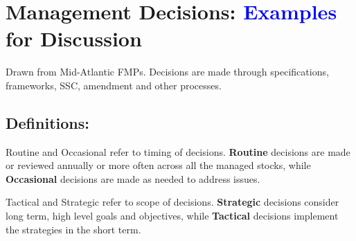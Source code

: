 \documentclass[
]{article}
\author{}
\date{\vspace{-2.5em}}
\begin{document}
\vspace{-1cm}

\section{\texorpdfstring{Management Decisions:
\textcolor{blue}{Examples} for
Discussion}{Management Decisions:  for Discussion}}\label{management-decisions-for-discussion}

Drawn from Mid-Atlantic FMPs. Decisions are made through specifications,
frameworks, SSC, amendment and other processes.

\subsection{Definitions:}\label{definitions}

\begin{noteblock}
Routine and Occasional refer to timing of decisions. \textbf{Routine}
decisions are made or reviewed annually or more often across all the
managed stocks, while \textbf{Occasional} decisions are made as needed
to address issues.

\end{noteblock}

\begin{noteblock}
Tactical and Strategic refer to scope of decisions. \textbf{Strategic}
decisions consider long term, high level goals and objectives, while
\textbf{Tactical} decisions implement the strategies in the short term.

\end{noteblock}
\end{document}
